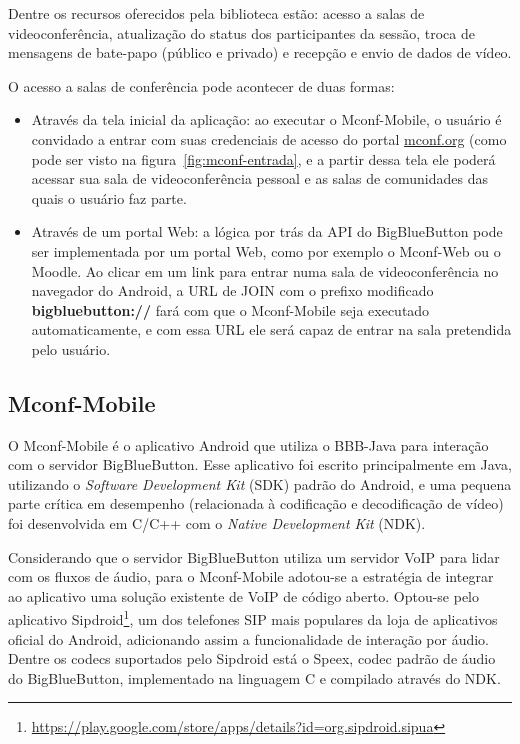 \documentclass{acm_proc_article-sp}
\begin{document}
Dentre os recursos oferecidos pela biblioteca estão: acesso a salas de videoconferência, atualização do status dos participantes da sessão, troca de mensagens de bate-papo (público e privado) e recepção e envio de dados de vídeo.

O acesso a salas de conferência pode acontecer de duas formas:
\begin{itemize}
 \item Através da tela inicial da aplicação: ao executar o Mconf-Mobile, o usuário é convidado a entrar com suas credenciais de acesso do portal \url{mconf.org} (como pode ser visto na figura~\ref{fig:mconf-entrada}, e a partir dessa tela ele poderá acessar sua sala de videoconferência pessoal e as salas de comunidades das quais o usuário faz parte.
 \item Através de um portal Web: a lógica por trás da API do BigBlueButton pode ser implementada por um portal Web, como por exemplo o Mconf-Web ou o Moodle. Ao clicar em um link para entrar numa sala de videoconferência no navegador do Android, a URL de JOIN com o prefixo modificado \textbf{bigbluebutton://} fará com que o Mconf-Mobile seja executado automaticamente, e com essa URL ele será capaz de entrar na sala pretendida pelo usuário.
\end{itemize}

\subsection{Mconf-Mobile}\label{subsec:bbb-android}

O Mconf-Mobile é o aplicativo Android que utiliza o BBB-Java para interação com o servidor BigBlueButton. Esse aplicativo foi escrito principalmente em Java, utilizando o \emph{Software Development Kit} (SDK) padrão do Android, e uma pequena parte crítica em desempenho (relacionada à codificação e decodificação de vídeo) foi desenvolvida em C/C++ com o \emph{Native Development Kit} (NDK).

Considerando que o servidor BigBlueButton utiliza um servidor VoIP para lidar com os fluxos de áudio, para o Mconf-Mobile adotou-se a estratégia de integrar ao aplicativo uma solução existente de VoIP de código aberto. Optou-se pelo aplicativo Sipdroid\footnote{\url{https://play.google.com/store/apps/details?id=org.sipdroid.sipua}}, um dos telefones SIP mais populares da loja de aplicativos oficial do Android, adicionando assim a funcionalidade de interação por áudio. Dentre os codecs suportados pelo Sipdroid está o Speex, codec padrão de áudio do BigBlueButton, implementado na linguagem C e compilado através do NDK.
\end{document}

